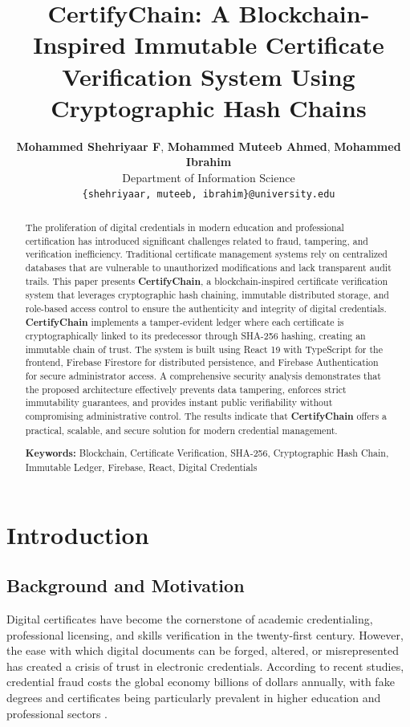 \documentclass[10pt,twocolumn,a4paper]{article}
\title{\vspace{-1cm}\textbf{CertifyChain: A Blockchain-Inspired Immutable Certificate Verification System Using Cryptographic Hash Chains}}
\author{
    \textbf{Mohammed Shehriyaar F}, \textbf{Mohammed Muteeb Ahmed}, \textbf{Mohammed Ibrahim}\\[0.2cm]
    \normalsize Department of Information Science\\[0.1cm]
    \normalsize \texttt{\{shehriyaar, muteeb, ibrahim\}@university.edu}
}
\date{}
\newcommand{\certifychain}{\textbf{CertifyChain}}
\begin{document}
\maketitle

\begin{abstract}
\noindent
The proliferation of digital credentials in modern education and professional certification has introduced significant challenges related to fraud, tampering, and verification inefficiency. Traditional certificate management systems rely on centralized databases that are vulnerable to unauthorized modifications and lack transparent audit trails. This paper presents \certifychain{}, a blockchain-inspired certificate verification system that leverages cryptographic hash chaining, immutable distributed storage, and role-based access control to ensure the authenticity and integrity of digital credentials. \certifychain{} implements a tamper-evident ledger where each certificate is cryptographically linked to its predecessor through SHA-256 hashing, creating an immutable chain of trust. The system is built using React 19 with TypeScript for the frontend, Firebase Firestore for distributed persistence, and Firebase Authentication for secure administrator access. A comprehensive security analysis demonstrates that the proposed architecture effectively prevents data tampering, enforces strict immutability guarantees, and provides instant public verifiability without compromising administrative control. The results indicate that \certifychain{} offers a practical, scalable, and secure solution for modern credential management.

\vspace{0.3cm}
\noindent\textbf{Keywords:} Blockchain, Certificate Verification, SHA-256, Cryptographic Hash Chain, Immutable Ledger, Firebase, React, Digital Credentials
\end{abstract}

\section{Introduction}

\subsection{Background and Motivation}

Digital certificates have become the cornerstone of academic credentialing, professional licensing, and skills verification in the twenty-first century. However, the ease with which digital documents can be forged, altered, or misrepresented has created a crisis of trust in electronic credentials. According to recent studies, credential fraud costs the global economy billions of dollars annually, with fake degrees and certificates being particularly prevalent in higher education and professional sectors \cite{gollin2019}.
\end{document}
